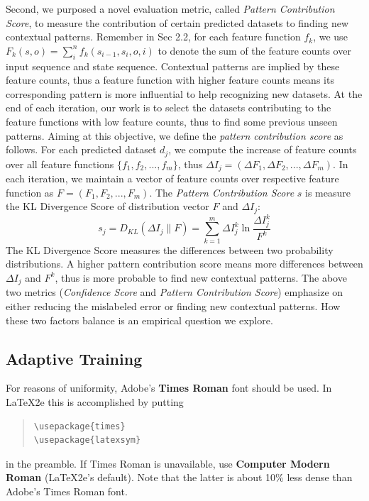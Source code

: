 \documentclass[11pt]{article}
\begin{document}
Second, we purposed a novel evaluation metric, called \emph{Pattern Contribution Score}, to measure the contribution of certain predicted datasets to finding new contextual patterns. Remember in Sec 2.2, for each feature function $f_k$, we use $F_k(s, o) = \sum_{i}^n f_{k}(s_{i-1}, s_{i}, o, i)$ to denote the sum of the feature counts over input sequence and state sequence. Contextual patterns are implied by these feature counts, thus a feature function with higher feature counts means its corresponding pattern is more influential to help recognizing new datasets. At the end of each iteration, our work is to select the datasets contributing to the feature functions with low feature counts, thus to find some previous unseen patterns. Aiming at this objective, we define the \emph{pattern contribution score} as follows. For each predicted dataset $d_j$, we compute the increase of feature counts over all feature functions $\{ f_1, f_2, ... ,f_m\}$, thus $\Delta I_j = (\Delta F_1, \Delta F_2, ... ,\Delta F_m)$. In each iteration, we maintain a vector of feature counts over respective feature function as $F = (F_1, F_2, ..., F_m)$. The \emph{Pattern Contribution Score} \textbf{$s$} is measure the KL Divergence Score of distribution vector $F$ and $\Delta I_j$:
\[
	s_j = D_{KL}(\Delta I_j \| F) = \sum_{k=1}^m \Delta I_j^k \ln \frac{\Delta I_j^k}{F^k}
\]
The KL Divergence Score measures the differences between two probability distributions. A higher pattern contribution score means more differences between $\Delta I_j$ and $F^k$, thus is more probable to find new contextual patterns. The above two metrics (\textit{Confidence Score} and \textit{Pattern Contribution Score}) emphasize on either reducing the mislabeled error or finding new contextual patterns. How these two factors balance is an empirical question we explore.

\subsection{Adaptive Training}

For reasons of uniformity, Adobe's {\bf Times Roman} font should be
used. In \LaTeX2e{} this is accomplished by putting

\begin{quote}
\begin{verbatim}
\usepackage{times}
\usepackage{latexsym}
\end{verbatim}
\end{quote}
in the preamble. If Times Roman is unavailable, use {\bf Computer
  Modern Roman} (\LaTeX2e{}'s default).  Note that the latter is about
  10\% less dense than Adobe's Times Roman font.
\end{document}
